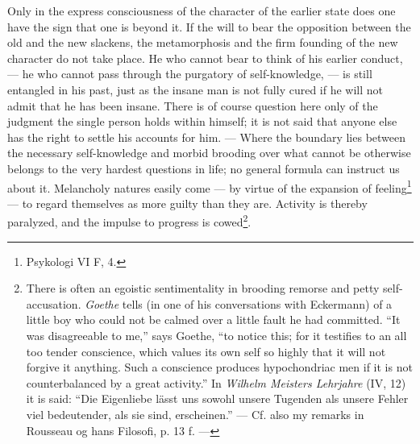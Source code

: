 \documentclass[12pt,a4paper,openany]{book}
\begin{document}
Only in the express consciousness of the character of the earlier state does one have the sign that one
is beyond it. If the will to bear the opposition between the old and the new slackens, the metamorphosis
and the firm founding of the new character do not take place. He who cannot bear to think of his earlier
conduct, --- he who cannot pass through the purgatory of self-knowledge, --- is still entangled in his
past, just as the insane man is not fully cured if he will not admit that he has been insane. There is of
course question here only of the judgment the single person holds within himself; it is not said that
anyone else has the right to settle his accounts for him. --- Where the boundary lies between the
necessary self-knowledge and morbid brooding over what cannot be otherwise belongs to the very hardest
questions in life; no general formula can instruct us about it. Melancholy natures easily come --- by
virtue of the expansion of feeling\footnote[2]{Psykologi VI F, 4.} --- to regard themselves as more
guilty than they are. Activity is thereby paralyzed, and the impulse to progress is cowed\footnote[3]{There
is often an egoistic sentimentality in brooding remorse and petty self-accusation. \emph{Goethe} tells (in
one of his conversations with Eckermann) of a little boy who could not be calmed over a little fault he
had committed. ``It was disagreeable to me,'' says Goethe, ``to notice this; for it testifies to an all
too tender conscience, which values its own self so highly that it will not forgive it anything. Such a
conscience produces hypochondriac men if it is not counterbalanced by a great activity.'' In
\textit{Wilhelm Meisters Lehrjahre} (IV, 12) it is said: ``Die Eigenliebe lässt uns sowohl unsere
Tugenden als unsere Fehler viel bedeutender, als sie sind, erscheinen.'' --- Cf. also my remarks in
Rousseau og hans Filosofi, p. 13 f. ---}.
\end{document}
